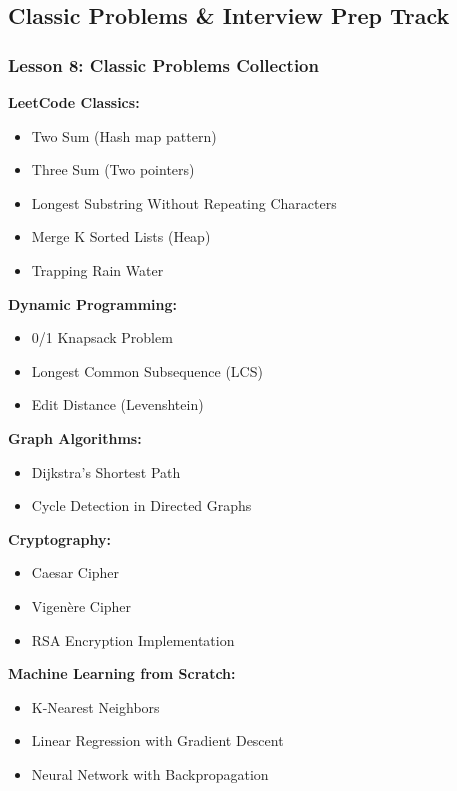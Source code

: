 \documentclass[11pt,letterpaper]{article}
\begin{document}
\subsection{Classic Problems \& Interview Prep Track}

\subsubsection{Lesson 8: Classic Problems Collection}
\textbf{LeetCode Classics:}
\begin{itemize}[leftmargin=*]
    \item Two Sum (Hash map pattern)
    \item Three Sum (Two pointers)
    \item Longest Substring Without Repeating Characters
    \item Merge K Sorted Lists (Heap)
    \item Trapping Rain Water
\end{itemize}

\textbf{Dynamic Programming:}
\begin{itemize}[leftmargin=*]
    \item 0/1 Knapsack Problem
    \item Longest Common Subsequence (LCS)
    \item Edit Distance (Levenshtein)
\end{itemize}

\textbf{Graph Algorithms:}
\begin{itemize}[leftmargin=*]
    \item Dijkstra's Shortest Path
    \item Cycle Detection in Directed Graphs
\end{itemize}

\textbf{Cryptography:}
\begin{itemize}[leftmargin=*]
    \item Caesar Cipher
    \item Vigenère Cipher
    \item RSA Encryption Implementation
\end{itemize}

\textbf{Machine Learning from Scratch:}
\begin{itemize}[leftmargin=*]
    \item K-Nearest Neighbors
    \item Linear Regression with Gradient Descent
    \item Neural Network with Backpropagation
\end{itemize}
\end{document}
